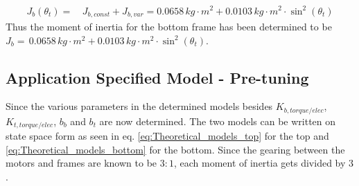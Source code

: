 \documentclass[../../main]{subfiles}
\begin{document}
\begin{equation}
  \label{eq:BottomFrame_moment_of_inertia}
\begin{split}
    J_{b}(\theta_t) =& \, J_{b,const} + J_{b,var} = 0.0658\si{\,kg\cdot m^2} + 0.0103 \si{\,kg\cdot m^2}\cdot \sin^2(\theta_t)
\end{split}
\end{equation}
Thus the moment of inertia for the bottom frame has been determined to be
\newline $J_{b} = \, 0.0658\si{\,kg\cdot m^2} + 0.0103 \si{\,kg\cdot m^2}\cdot \sin^2(\theta_t)$.

\subsection{Application Specified Model - Pre-tuning}
Since the various parameters in the determined models besides $K_{b,torque/elec}$, $K_{t,torque/elec}$, $b_b$ and $b_t$ are now determined. The two models can be written on state space form as seen in eq. \eqref{eq:Theoretical_models_top} for the top and \eqref{eq:Theoretical_models_bottom} for the bottom. Since the gearing between the motors and frames are known to be $3:1$, each moment of inertia gets divided by $3$.
\end{document}
